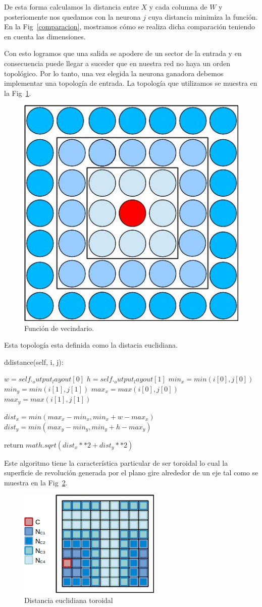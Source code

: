 De esta forma calculamos la distancia entre $X$ y cada columna de $W$ y posteriomente nos quedamos con la neurona $j$ cuya distancia minimiza la función. En la Fig~\ref{comparacion}, mostramos cómo se realiza dicha comparación teniendo en cuenta las dimensiones.

Con esto logramos que una salida se apodere de un sector de la entrada y en consecuencia puede llegar a suceder que en nuestra red no haya un orden topológico. Por lo tanto, una vez elegida la neurona ganadora debemos implementar una topología de entrada. La topología que utilizamos se muestra en la Fig~\ref{vecindario}.

\begin{figure}[ht!]
	\centering
	\includegraphics[width=0.3\linewidth]{img/parte2-vecindario.jpg}
	\caption{Función de vecindario.}
	\label{vecindario}
\end{figure}

Esta topología esta definida como la distacia euclidiana. 

\begin{algorithm}
	\caption{ddistance(self, i, j):}
	\begin{algorithmic}
		\State $w = self._output_layout[0]$
		\State $h = self._output_layout[1]$
		\State $min_x = min(i[0], j[0])$
		\State $min_y = min(i[1], j[1])$
		\State $max_x = max(i[0], j[0])$
		\State $max_y = max(i[1], j[1])$

		\State $dist_x = min(max_x-min_x, min_x + w - max_x)$
		\State $dist_y = min(max_y - min_y, min_y + h - max_y)$

		\State return $math.sqrt(dist_x**2 + dist_y**2)$
	\end{algorithmic}
\end{algorithm}

Este algoritmo tiene la característica particular de ser toroidal lo cual la superficie de revolución generada por el plano gire alrededor de un eje tal como se muestra en la Fig~\ref{dist-euclideana}.

\begin{figure}[ht!]
	\centering
	\includegraphics[width=0.5\linewidth]{img/parte2-toroidal.jpg}
	\caption{Distancia euclidiana toroidal}
	\label{dist-euclideana}
\end{figure}

